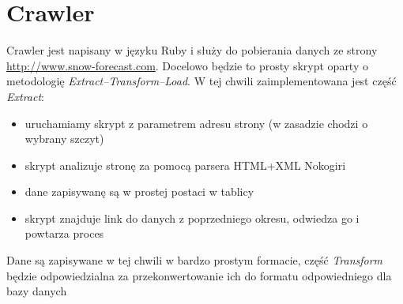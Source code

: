 \documentclass[12pt]{article}
\begin{document}
\section{Crawler}
Crawler jest napisany w języku Ruby i służy do pobierania danych ze strony \url{http://www.snow-forecast.com}.
Docelowo będzie to prosty skrypt oparty o metodologię \emph{Extract--Transform--Load}. W tej chwili zaimplementowana
jest część \emph{Extract}:
\begin{itemize}
\item uruchamiamy skrypt z parametrem adresu strony (w zasadzie chodzi o wybrany szczyt)
\item skrypt analizuje stronę za pomocą parsera HTML+XML Nokogiri
\item dane zapisywanę są w prostej postaci w tablicy
\item skrypt znajduje link do danych z poprzedniego okresu, odwiedza go i powtarza proces
\end{itemize}

Dane są zapisywane w tej chwili w bardzo prostym formacie, część \emph{Transform} będzie odpowiedzialna
za przekonwertowanie ich do formatu odpowiedniego dla bazy danych
\end{document}
